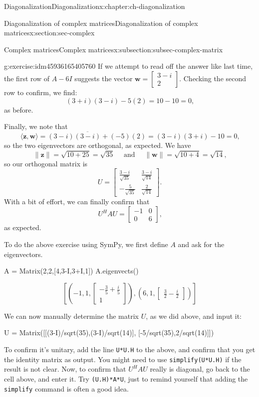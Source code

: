\documentclass[oneside,10pt,]{book}
\newcommand{\mono}[1]{\texttt{#1}}
\numberwithin{equation}{section}
\newcommand{\bbm}{\begin{bmatrix}}
\newcommand{\ebm}{\end{bmatrix}}
\newcommand{\len}[1]{\lVert #1\rVert}
\newcommand{\zz}{\mathbf{z}}
\newcommand{\ww}{\mathbf{w}}
\newcommand{\amp}{&}
\begin{document}
\begin{chapterptx}{Diagonalization}{}{Diagonalization}{}{}{x:chapter:ch-diagonalization}
\begin{sectionptx}{Diagonalization of complex matrices}{}{Diagonalization of complex matrices}{}{}{x:section:sec-complex}
\begin{subsectionptx}{Complex matrices}{}{Complex matrices}{}{}{x:subsection:subsec-complex-matrix}
\begin{inlineexercise}{}{g:exercise:idm45936165405760}
If we attempt to read off the answer like last time, the first row of \(A-6I\) suggests the vector \(\ww = \bbm 3-i\\2\ebm\). Checking the second row to confirm, we find:%
\begin{equation*}
(3+i)(3-i)-5(2) = 10-10=0\text{,}
\end{equation*}
as before.%
\par
Finally, we note that%
\begin{equation*}
\langle \zz, \ww\rangle = (3-i)\overline{(3-i)}+(-5)(2) = (3-i)(3+i)-10 = 0\text{,}
\end{equation*}
so the two eigenvectors are orthogonal, as expected. We have%
\begin{equation*}
\len{\zz}=\sqrt{10+25}=\sqrt{35} \quad \text{ and } \quad \len{\ww}=\sqrt{10+4}=\sqrt{14}\text{,}
\end{equation*}
so our orthogonal matrix is%
\begin{equation*}
U = \bbm \frac{3-i}{\sqrt{35}}\amp \frac{3-i}{\sqrt{14}}\\-\frac{5}{\sqrt{35}}\amp \frac{2}{\sqrt{14}}\ebm\text{.}
\end{equation*}
With a bit of effort, we can finally confirm that%
\begin{equation*}
U^HAU = \bbm -1\amp 0\\0\amp 6\ebm\text{,}
\end{equation*}
as expected.%
\end{inlineexercise}%
To do the above exercise using SymPy, we first define \(A\) and ask for the eigenvectors.%
\begin{sageinput}
A = Matrix(2,2,[4,3-I,3+I,1])
A.eigenvects()
\end{sageinput}
\begin{sageoutput}
\[\left[\left(-1,1,\bbm -\frac35+\frac{i}{5}\\1\ebm\right),\left(6,1,\bbm \frac32-\frac{i}{2}\ebm\right)\right]\]
\end{sageoutput}
We can now manually determine the matrix \(U\), as we did above, and input it:%
\begin{sageinput}
U = Matrix([[(3-I)/sqrt(35),(3-I)/sqrt(14)],
            [-5/sqrt(35),2/sqrt(14)]])
\end{sageinput}
To confirm it's unitary, add the line \mono{U*U.H} to the above, and confirm that you get the identity matrix as output. You might need to use \mono{simplify(U*U.H)} if the result is not clear. Now, to confirm that \(U^HAU\) really is diagonal, go back to the cell above, and enter it. Try \mono{(U.H)*A*U}, just to remind yourself that adding the \mono{simplify} command is often a good idea.%

\end{subsectionptx}
\end{sectionptx}
\end{chapterptx}
\end{document}
